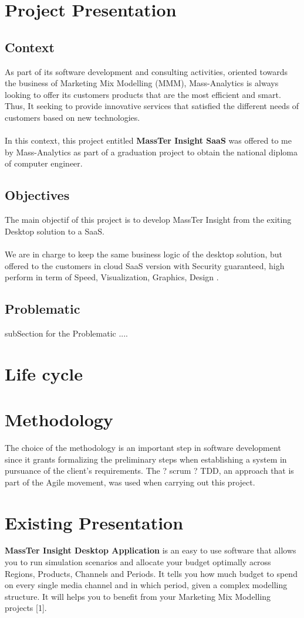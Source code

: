 \documentclass[12pt]{article}
\begin{document}
	\section{Project Presentation}
	
	\subsection{Context}
	As part of its software development and consulting activities, oriented towards the business of Marketing Mix Modelling (MMM), Mass-Analytics is always looking to offer its customers products that are the most efficient and smart. Thus, It seeking to provide innovative services that satisfied the different needs of customers based on new technologies.
	\\
	\\
	In this context, this project entitled \textbf{MassTer Insight SaaS} was offered to me by Mass-Analytics as part of a graduation project to obtain the national diploma of computer engineer.      
	\subsection{Objectives}
	The main objectif of this project is to develop MassTer Insight from the exiting Desktop solution to a SaaS.
	\\
	\\
	We are in charge to keep the same business logic of the desktop solution, but offered to the customers in cloud SaaS version with Security guaranteed,  high perform in term of Speed, Visualization, Graphics, Design .
	\subsection{Problematic}
	subSection for the Problematic ....

	\section{Life cycle}
	\section{Methodology}
	The choice of the methodology is an important step in software development since it grants formalizing the preliminary steps when establishing a system in pursuance of the client’s requirements.
	The  ? scrum ? TDD, an approach that is part of the Agile movement, was used when carrying out this project.
		\section{Existing Presentation}
	\textbf{MassTer Insight Desktop Application} is an easy to use software that allows you to run simulation scenarios and allocate your budget optimally across Regions, Products, Channels and Periods. It tells you how much budget to spend on every single media channel and in which period, given a complex modelling structure. It will helps you to benefit from your Marketing Mix Modelling projects [1]. 
\end{document}
